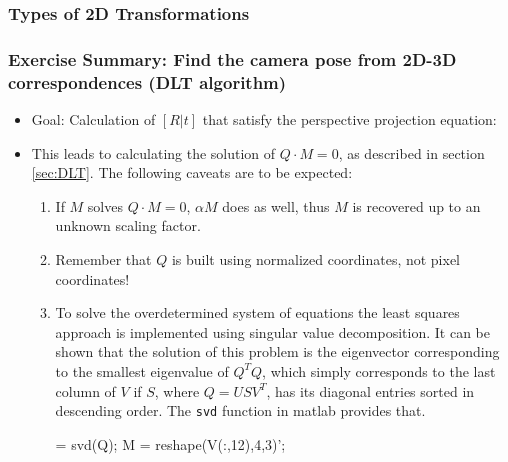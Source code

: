 \documentclass[10pt,a4paper]{scrartcl}
\begin{document}
\begin{multicols*}{2}
\subsubsection{Types of 2D Transformations}


\subsubsection{Exercise Summary: Find the camera pose from 2D-3D correspondences (DLT algorithm)}

\begin{itemize}
\item Goal: Calculation of $[R|t]$ that satisfy the perspective projection equation:

\item This leads to calculating the solution of $Q\cdot M = 0$, as described in section \ref{sec:DLT}. The following caveats are to be expected:
\begin{enumerate}
\item If $M$ solves $Q\cdot M = 0$, $\alpha M$ does as well, thus $M$ is recovered up to an unknown scaling factor.
\item Remember that $Q$ is built using normalized coordinates, not pixel coordinates!
\item To solve the overdetermined system of equations the least squares approach is implemented using singular value decomposition. It can be shown that the solution of this problem is the eigenvector corresponding to the smallest eigenvalue of $Q^TQ$, which simply corresponds to the last column of $V$ if $S$, where $Q = USV^T$, has its diagonal entries sorted in descending order. The \verb+svd+ function in matlab provides that.

\begin{TPMatlab}
[~,~,V] = svd(Q);
M = reshape(V(:,12),4,3)';
\end{TPMatlab}


\end{enumerate}
\end{itemize}
\end{multicols*}
\end{document}

